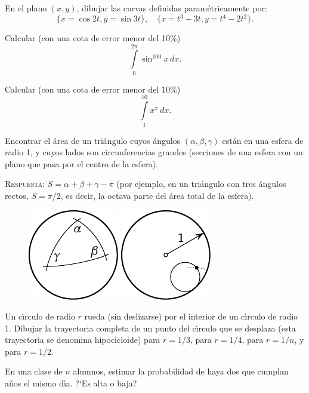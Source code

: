 \documentclass[12pt]{article}  %
\begin{document}
\bigskip
{} En el plano $(x,y)$, dibujar las curvas definidas param\'etricamente por: 
\[
\{x=\cos 2t, y=\sin 3t\},\quad 
\{x=t^3-3t, y=t^4-2t^2\}.
\]

\bigskip
{} Calcular (con una cota de error menor del 10\%)
$$
\int\limits_0^{2\pi} \sin^{100} x\,dx.
$$

\bigskip
{} Calcular (con una cota de error menor del 10\%)
$$
\int\limits_1^{10} x^x\,dx.
$$

\bigskip
{} Encontrar el \'area de un tri\'angulo cuyos \'angulos $(\alpha, \beta, \gamma)$ est\'an en una esfera de radio 1,
y cuyos lados son circunferencias grandes (secciones de una esfera con un plano que pasa por el centro de la esfera).

\medskip
\textsc{Respuesta:} $S=\alpha+\beta+\gamma-\pi$ (por ejemplo, en un tri\'angulo con tres \'angulos rectos, $S=\pi/2$, es decir, la octava parte del \'area total de la esfera).
\begin{figure}[h]
\centering
 \includegraphics{taskbook-44}\hskip2cm \includegraphics{taskbook-45}
\end{figure}

\bigskip
{} Un c\'{\i}rculo de radio $r$ rueda (sin deslizarse) por el interior de un c\'{\i}rculo de radio 1.
Dibujar la trayectoria completa de un punto del c\'{\i}rculo que se desplaza (esta trayectoria se denomina hipocicloide) 
para $r=1/3$, para $r=1/4$, para $r=1/n$, y para $r=1/2$.

\bigskip
{} En una clase de $n$ alumnos, estimar la probabilidad de haya dos que cumplan a\~nos el mismo d\'{\i}a. ?`Es alta o baja?
\end{document}
